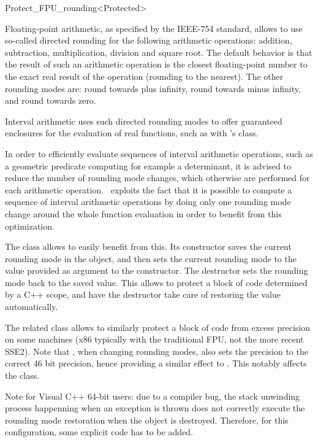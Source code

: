 
\begin{ccRefClass}{Protect_FPU_rounding<Protected>}
\label{protect_fpu_rouding}

\ccDefinition

Floating-point arithmetic, as specified by the IEEE-754 standard, allows to use
so-called directed rounding for the following arithmetic operations: addition,
subtraction, multiplication, division and square root.  The default behavior is
that the result of such an arithmetic operation is the closest floating-point
number to the exact real result of the operation (rounding to the nearest).
The other rounding modes are: round towards plus infinity, round towards minus
infinity, and round towards zero.

Interval arithmetic uses such directed rounding modes to offer guaranteed
enclosures for the evaluation of real functions, such as with \cgal's
 class.

In order to efficiently evaluate sequences of interval arithmetic operations,
such as a geometric predicate computing for example a determinant, it is
advised to reduce the number of rounding mode changes, which otherwise are
performed for each arithmetic operation.  \cgal\ exploits the fact that it is
possible to compute a sequence of interval arithmetic operations by doing only
one rounding mode change around the whole function evaluation in order to
benefit from this optimization.

The class  allows to easily benefit from this.
Its constructor saves the current rounding mode in the object, and then sets
the current rounding mode to the value provided as argument to the constructor.
The destructor sets the rounding mode back to the saved value.
This allows to protect a block of code determined by a C++ scope, and have
the destructor take care of restoring the value automatically.

The related class  allows to similarly protect
a block of code from excess precision on some machines (x86 typically with
the traditional FPU, not the more recent SSE2).  Note that
, when changing rounding modes, also sets the precision
to the correct 46 bit precision, hence providing a similar effect to
.  This notably affects the  class.

Note for Visual C++ 64-bit users: due to a compiler bug, the stack unwinding
process happenning when an exception is thrown does not correctly execute the
rounding mode restoration when the  object is
destroyed.  Therefore, for this configuration, some explicit code has to be
added.


\end{ccRefClass}
